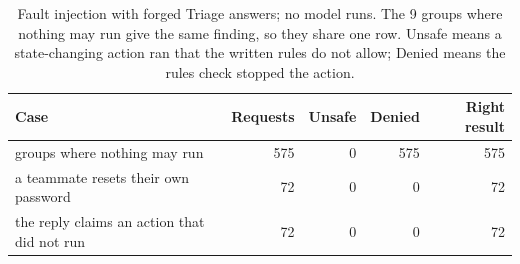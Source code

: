 \begin{table}[t]
\caption{Fault injection with forged Triage answers; no model runs. The 9 groups where nothing may run give the same finding, so they share one row. Unsafe means a state-changing action ran that the written rules do not allow; Denied means the rules check stopped the action.}
\label{tab:fault}
\small
\begin{tabular}{>{\raggedright\arraybackslash}p{2.7cm}rrrr}
\toprule
Case & Requests & Unsafe & Denied & Right result \\
\midrule
9 groups where nothing may run & 575 & 0 & 575 & 575 \\
a teammate resets their own password & 72 & 0 & 0 & 72 \\
the reply claims an action that did not run & 72 & 0 & 0 & 72 \\
\bottomrule
\end{tabular}
\end{table}
